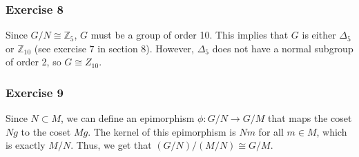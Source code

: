 \subsubsection{Exercise 8}
Since $G/N \cong \mathbb{Z}_5$, $G$ must be a group of order 10. This implies that  $G$ is either  $\Delta_5$
or $\mathbb{Z}_10$ (see exercise 7 in section 8). However, $\Delta_5$ does not have a normal subgroup
of order 2, so $G \cong Z_{10}$.

\subsubsection{Exercise 9}
Since $N \subset M$, we can define an epimorphism $\phi: G / N \to G / M$ that maps the coset $Ng$ to the
coset  $Mg$. The kernel of this epimorphism is $Nm$ for all $m \in M$, which is exactly $M / N$. Thus,
we get that  $(G / N) / (M / N) \cong G / M$.

